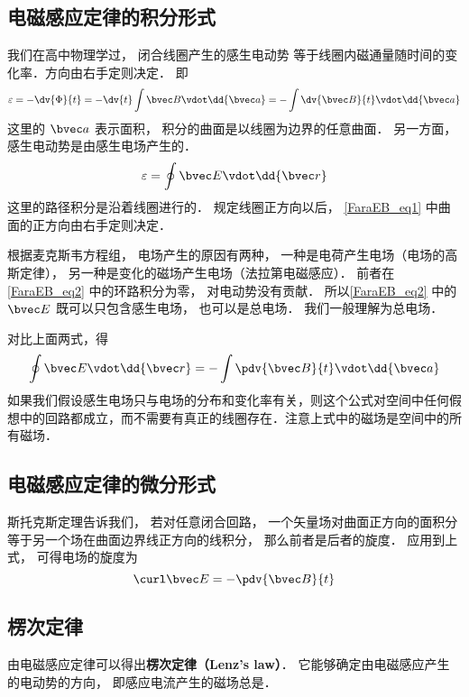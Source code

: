 
\begin{issues}
\issueAbstract
\issueTODO
\end{issues}


\subsection{电磁感应定律的积分形式}

我们在高中物理学过， 闭合线圈产生的感生电动势 %
等于线圈内磁通量随时间的变化率．方向由右手定则决定． 即
\begin{equation}\label{FaraEB_eq1}
\varepsilon  =  -\dv{\Phi}{t} =  - \dv{t} \int \bvec B \vdot \dd{\bvec a} =  - \int \dv{\bvec B}{t} \vdot \dd{\bvec a}
\end{equation} 
这里的 $\bvec a$ 表示面积， 积分的曲面是以线圈为边界的任意曲面． 另一方面，感生电动势是由感生电场产生的． 
\begin{equation}\label{FaraEB_eq2}
\varepsilon  = \oint \bvec E \vdot \dd{\bvec r}
\end{equation}
这里的路径积分是沿着线圈进行的． 规定线圈正方向以后， \autoref{FaraEB_eq1} 中曲面的正方向由右手定则决定．

根据麦克斯韦方程组， 电场产生的原因有两种， 一种是电荷产生电场（电场的高斯定律）， 另一种是变化的磁场产生电场（法拉第电磁感应）． 前者在\autoref{FaraEB_eq2} 中的环路积分为零， 对电动势没有贡献． 所以\autoref{FaraEB_eq2} 中的 $\bvec E$ 既可以只包含感生电场， 也可以是总电场． 我们一般理解为总电场．

对比上面两式，得
\begin{equation}
\oint \bvec E \vdot \dd{\bvec r}  =  - \int \pdv{\bvec B}{t} \vdot \dd{\bvec a} 
\end{equation} 
如果我们假设感生电场只与电场的分布和变化率有关，则这个公式对空间中任何假想中的回路都成立，而不需要有真正的线圈存在．注意上式中的磁场是空间中的所有磁场．

\subsection{电磁感应定律的微分形式}
斯托克斯定理告诉我们， 若对任意闭合回路， 一个矢量场对曲面正方向的面积分等于另一个场在曲面边界线正方向的线积分， 那么前者是后者的旋度．
应用到上式， 可得电场的旋度为
\begin{equation}\label{FaraEB_eq3}
\curl \bvec E =  - \pdv{\bvec B}{t}
\end{equation} 

\subsection{楞次定律}
由电磁感应定律可以得出\textbf{楞次定律（Lenz's law）}． 它能够确定由电磁感应产生的电动势的方向， 即感应电流产生的磁场总是． 
